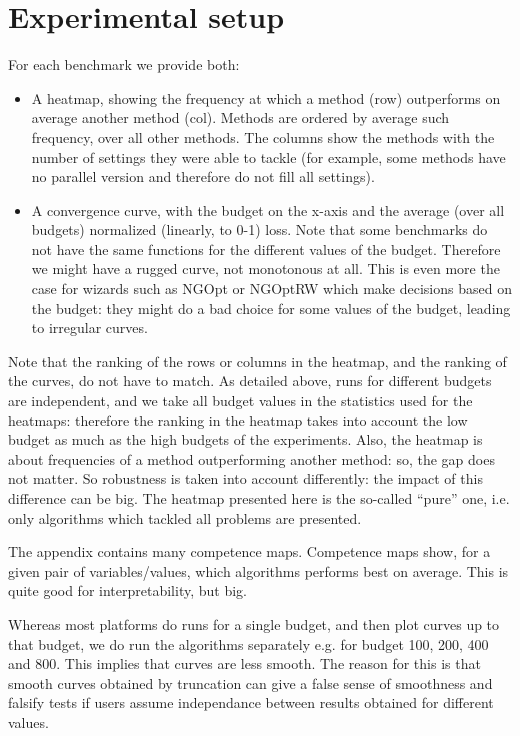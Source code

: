 \documentclass{article}
\begin{document}
\section{Experimental setup}
For each benchmark we provide both:
\begin{itemize}
\item A heatmap, showing the frequency at which a method (row) outperforms on average another method (col). Methods are ordered by average such frequency, over all other methods.
The columns show the methods with the number of settings they were able to tackle (for example, some methods have no parallel version and therefore do not fill all settings).
\item A convergence curve, with the budget on the x-axis and the average (over all budgets) normalized (linearly, to
0-1) loss. Note that some benchmarks do not have the same functions for the different values of the budget. Therefore we
might have a rugged curve, not monotonous at all. This is even more the case for wizards such as NGOpt or NGOptRW which
make decisions based on the budget: they might do a bad choice for some values of the budget, leading to irregular
curves.
\end{itemize}
Note that the ranking of the rows or columns in the heatmap, and the ranking of the curves, do not have to match. As
detailed above, runs for different budgets are independent, and we take all budget values in the statistics used for the
heatmaps: therefore the ranking in the heatmap takes into account the low budget as much as the high budgets of the
experiments. Also, the heatmap is about frequencies of a method outperforming another method: so, the gap does not
matter. So robustness is taken into account differently: the impact of this difference can be big.
The heatmap presented here is the so-called ``pure'' one, i.e. only algorithms which tackled all problems are presented.

The appendix contains many competence maps. Competence maps show, for a given pair of variables/values, which algorithms performs best on average. This is quite good for interpretability, but big.

Whereas most platforms do runs for a single budget, and then plot curves up to that budget, we do run the algorithms separately e.g. for budget 100, 200, 400 and 800. This implies that curves are less smooth. The reason for this is that smooth curves obtained by truncation can give a false sense of smoothness and falsify tests if users assume independance between results obtained for different values.
\end{document}

